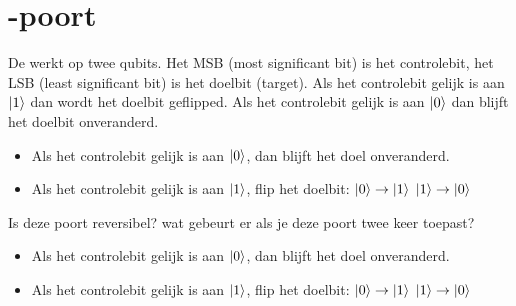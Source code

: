 \documentclass[../../main.tex]{subfiles}
\begin{document}
\begin{center}
\end{center}


\section{-poort}
De  werkt op twee qubits. 
Het MSB (most significant bit) is het controlebit, het LSB (least significant bit) is het doelbit (target). Als het controlebit gelijk is aan $\ket{1}$ dan wordt het doelbit geflipped. Als het controlebit gelijk is aan $\ket{0}$ dan blijft het doelbit onveranderd.

\begin{itemize}
\item Als het controlebit gelijk is aan $\ket{0}$, dan blijft het doel onveranderd.
\item Als het controlebit gelijk is aan $\ket{1}$, flip het doelbit: 
$\ket{0} \rightarrow \ket{1}$
$\ket{1} \rightarrow \ket{0}$
\end{itemize}

Is deze poort reversibel? wat gebeurt er als je deze poort twee keer toepast?

\begin{itemize}
\item Als het controlebit gelijk is aan $\ket{0}$, dan blijft het doel onveranderd.
\item Als het controlebit gelijk is aan $\ket{1}$, flip het doelbit: 
$\ket{0} \rightarrow \ket{1}$
$\ket{1} \rightarrow \ket{0}$
\end{itemize}
\end{document}
